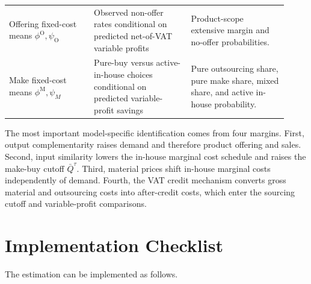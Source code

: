 \documentclass[11pt,a4paper]{article}
\newcommand{\M}{\mathrm{M}}
\newcommand{\OFC}{\mathrm{O}}
\begin{document}
\begin{longtable}{L{0.28\linewidth}L{0.32\linewidth}L{0.32\linewidth}}
\addlinespace
Offering fixed-cost means $\phi^{\OFC},\psi_{\OFC}$ & Observed non-offer rates conditional on predicted net-of-VAT variable profits & Product-scope extensive margin and no-offer probabilities. \\
\addlinespace
Make fixed-cost means $\phi^{\M},\psi_M$ & Pure-buy versus active-in-house choices conditional on predicted variable-profit savings & Pure outsourcing share, pure make share, mixed share, and active in-house probability. \\
\bottomrule
\end{longtable}

The most important model-specific identification comes from four margins. First, output complementarity raises demand and therefore product offering and sales. Second, input similarity lowers the in-house marginal cost schedule and raises the make-buy cutoff $\bar Q^{\tau}$. Third, material prices shift in-house marginal costs independently of demand. Fourth, the VAT credit mechanism converts gross material and outsourcing costs into after-credit costs, which enter the sourcing cutoff and variable-profit comparisons.

\section{Implementation Checklist}

The estimation can be implemented as follows.
\end{document}
